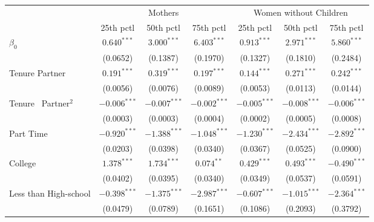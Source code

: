 \begin{tabular}{l|ccc|ccc}
\toprule
{} & \multicolumn{3}{c}{Mothers} & \multicolumn{3}{c}{Women without Children} \\
{} &       25th pctl &       50th pctl &       75th pctl &              25th pctl &       50th pctl &       75th pctl \\
\midrule
$\beta_0$                     &   $0.640^{***}$ &   $3.000^{***}$ &   $6.403^{***}$ &          $0.913^{***}$ &   $2.971^{***}$ &   $5.860^{***}$ \\
                              &        (0.0652) &        (0.1387) &        (0.1970) &               (0.1327) &        (0.1810) &        (0.2484) \\
Tenure Partner                &   $0.191^{***}$ &   $0.319^{***}$ &   $0.197^{***}$ &          $0.144^{***}$ &   $0.271^{***}$ &   $0.242^{***}$ \\
                              &        (0.0056) &        (0.0076) &        (0.0089) &               (0.0053) &        (0.0113) &        (0.0144) \\
Tenure \ Partner$^{2}$        &  $-0.006^{***}$ &  $-0.007^{***}$ &  $-0.002^{***}$ &         $-0.005^{***}$ &  $-0.008^{***}$ &  $-0.006^{***}$ \\
                              &        (0.0003) &        (0.0003) &        (0.0004) &               (0.0002) &        (0.0005) &        (0.0008) \\
Part Time                     &  $-0.920^{***}$ &  $-1.388^{***}$ &  $-1.048^{***}$ &         $-1.230^{***}$ &  $-2.434^{***}$ &  $-2.892^{***}$ \\
                              &        (0.0203) &        (0.0398) &        (0.0340) &               (0.0367) &        (0.0525) &        (0.0900) \\
College                       &   $1.378^{***}$ &   $1.734^{***}$ &    $0.074^{**}$ &          $0.429^{***}$ &   $0.493^{***}$ &  $-0.490^{***}$ \\
                              &        (0.0402) &        (0.0395) &        (0.0340) &               (0.0349) &        (0.0537) &        (0.0591) \\
Less than High-school         &  $-0.398^{***}$ &  $-1.375^{***}$ &  $-2.987^{***}$ &         $-0.607^{***}$ &  $-1.015^{***}$ &  $-2.364^{***}$ \\
                              &        (0.0479) &        (0.0789) &        (0.1651) &               (0.1086) &        (0.2093) &        (0.3792) \\

\end{tabular}
